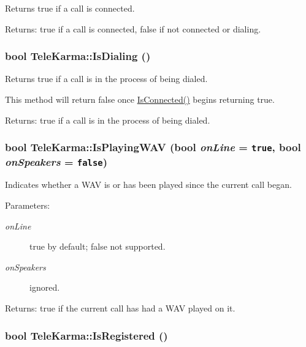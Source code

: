 Returns true if a call is connected. 

\begin{Desc}
\item[Returns:]true if a call is connected, false if not connected or dialing. \end{Desc}
\hypertarget{classTeleKarma_4c060e114d5e1d4f7ec2b4532a843443}{
\subsubsection[{IsDialing}]{\setlength{\rightskip}{0pt plus 5cm}bool TeleKarma::IsDialing ()}}
\label{classTeleKarma_4c060e114d5e1d4f7ec2b4532a843443}


Returns true if a call is in the process of being dialed. 

This method will return false once \hyperlink{classTeleKarma_d971a263dc085039322afa915a6ff350}{IsConnected()} begins returning true. \begin{Desc}
\item[Returns:]true if a call is in the process of being dialed. \end{Desc}
\hypertarget{classTeleKarma_4b4ffc065dbc11f5b0afa9ba30c9620d}{
\subsubsection[{IsPlayingWAV}]{\setlength{\rightskip}{0pt plus 5cm}bool TeleKarma::IsPlayingWAV (bool {\em onLine} = {\tt true}, \/  bool {\em onSpeakers} = {\tt false})}}
\label{classTeleKarma_4b4ffc065dbc11f5b0afa9ba30c9620d}


Indicates whether a WAV is or has been played since the current call began. 

\begin{Desc}
\item[Parameters:]
\begin{description}
\item[{\em onLine}]true by default; false not supported. \item[{\em onSpeakers}]ignored. \end{description}
\end{Desc}
\begin{Desc}
\item[Returns:]true if the current call has had a WAV played on it. \end{Desc}
\hypertarget{classTeleKarma_ac8cc89975dcba9feefeb0f79684836e}{
\subsubsection[{IsRegistered}]{\setlength{\rightskip}{0pt plus 5cm}bool TeleKarma::IsRegistered ()}}
\label{classTeleKarma_ac8cc89975dcba9feefeb0f79684836e}


